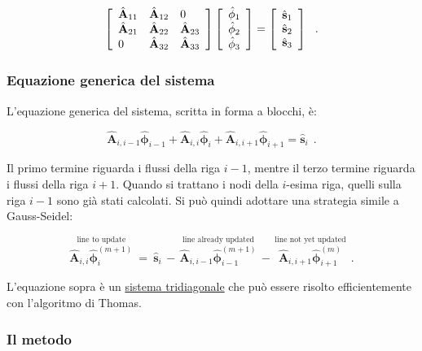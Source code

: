 \[
\left[ \begin{array}{l l l}
	\hat{\mathbf{A}}_{11} & \hat{\mathbf{A}}_{12} & 0 \\
	\hat{\mathbf{A}}_{21} & \hat{\mathbf{A}}_{22} & \hat{\mathbf{A}}_{23} \\
	0 & \hat{\mathbf{A}}_{32} & \hat{\mathbf{A}}_{33}
\end{array} \right]
\left[ \begin{array}{l}
	\hat{\mathbf{\phi}}_1 \\ \hat{\mathbf{\phi}}_2 \\ \hat{\mathbf{\phi}}_3
\end{array} \right]
=
\left[ \begin{array}{l}
	\hat{\mathbf{s}}_1 \\ \hat{\mathbf{s}}_2 \\ \hat{\mathbf{s}}_3
\end{array} \right]\ \ . 
\]



\subsubsection{Equazione generica del sistema}

L'equazione generica del sistema, scritta in forma a blocchi, è:

\[
\hat{\mathbf{A}}_{i,i-1} \hat{\mathbf{\phi}}_{i-1} + \hat{\mathbf{A}}_{i,i} \hat{\mathbf{\phi}}_i + \hat{\mathbf{A}}_{i,i+1} \hat{\mathbf{\phi}}_{i+1} = \hat{\mathbf{s}}_i\ \ . 
\]

Il primo termine riguarda i flussi della riga \(i-1\), mentre il terzo termine riguarda i flussi della riga \(i+1\). Quando si trattano i nodi della \(i\)-esima riga, quelli sulla riga \(i-1\) sono già stati calcolati. Si può quindi adottare una strategia simile a Gauss-Seidel:

\[
\overset{\text{line to update}}{\hat{\mathbf{A}}_{i,i} \hat{\mathbf{\phi}}_i^{(m+1)}}\ =\ \hat{\mathbf{s}}_i\, -\, \overset{\text{line already updated}}{\hat{\mathbf{A}}_{i,i-1} \hat{\mathbf{\phi}}_{i-1}^{(m+1)}}\, -\, \overset{\text{line not yet updated}}{\hat{\mathbf{A}}_{i,i+1} \hat{\mathbf{\phi}}_{i+1}^{(m)}}\ \ . 
\]

L'equazione sopra è un \underline{sistema tridiagonale} che può essere risolto efficientemente con l'algoritmo di Thomas.


\subsubsection{Il metodo}


